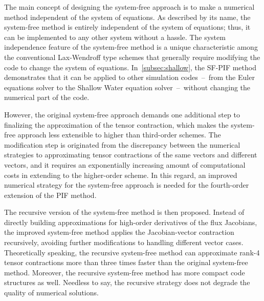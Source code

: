 The main concept of designing the system-free approach is to make a numerical method
independent of the system of equations. As described by its name, the system-free method
is entirely independent of the system of equations;
thus, it can be implemented to any other system without a hassle.
The system independence feature of the system-free method is a unique characteristic
among the conventional Lax-Wendroff type schemes that generally require
modifying the code to change the system of equations.
In~\cref{subsec:shallow}, the SF-PIF method demonstrates that
it can be applied to other simulation codes~--~from the Euler equations solver
to the Shallow Water equation solver~--~without changing the numerical part of the code.

However, the original system-free approach demands one additional step
to finalizing the approximation of the tensor contraction,
which makes the system-free approach less extensible to higher than third-order schemes.
The modification step is originated from the discrepancy between
the numerical strategies to approximating tensor contractions of the same vectors and different vectors,
and it requires an exponentially increasing amount of computational costs
in extending to the higher-order scheme.
In this regard, an improved numerical strategy
for the system-free approach is needed for the fourth-order extension of the PIF method.

The recursive version of the system-free method is then proposed.
Instead of directly building approximations for high-order derivatives of the flux Jacobians,
the improved system-free method applies the Jacobian-vector contraction recursively,
avoiding further modifications to handling different vector cases.
Theoretically speaking, the recursive system-free method can approximate rank-4 tensor contractions
more than three times faster than the original system-free method.
Moreover, the recursive system-free method has more compact code structures as well.
Needless to say, the recursive strategy does not degrade the quality of numerical solutions.

